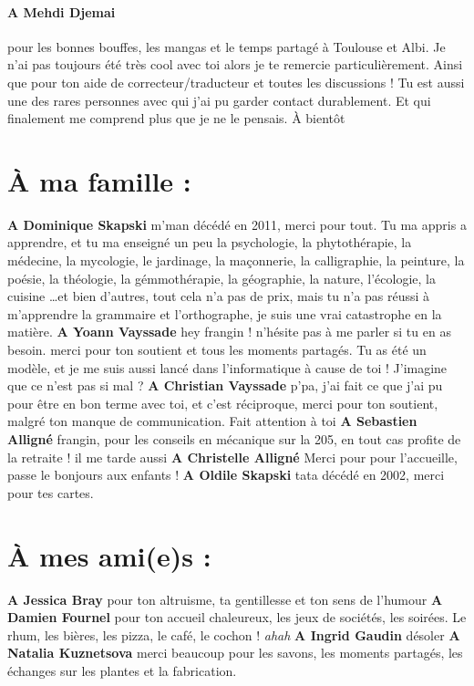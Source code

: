 \documentclass[../thesis.tex]{subfiles}
\begin{document}
\paragraph{A Mehdi Djemai} pour les bonnes bouffes, les mangas et le temps partagé à Toulouse et Albi.
Je n'ai pas toujours été très cool avec toi alors je te remercie particulièrement.
Ainsi que pour ton aide de correcteur/traducteur et toutes les discussions !
Tu est aussi une des rares personnes avec qui j'ai pu garder contact durablement.
Et qui finalement me comprend plus que je ne le pensais. À bientôt 

\section*{À ma famille :}

\textbf{A Dominique Skapski} m'man décédé en 2011, merci pour tout.
Tu ma appris a apprendre, et tu ma enseigné un peu
la psychologie, la phytothérapie, la médecine, la mycologie, le jardinage, la maçonnerie,
la calligraphie, la peinture, la poésie, la théologie, la gémmothérapie, la géographie, la nature, l'écologie, la cuisine
\dots et bien d'autres, tout cela n'a pas de prix, mais tu n'a pas réussi à m'apprendre la grammaire et l'orthographe, je suis une vrai catastrophe en la matière.
\textbf{A Yoann Vayssade} hey frangin ! n'hésite pas à me parler si tu en as besoin.
merci pour ton soutient et tous les moments partagés.
Tu as été un modèle, et je me suis aussi lancé dans l'informatique à cause de toi !
J'imagine que ce n'est pas si mal ?
\textbf{A Christian Vayssade} p'pa, j'ai fait ce que j'ai pu pour être en bon terme avec toi, et c'est réciproque,
merci pour ton soutient, malgré ton manque de communication. Fait attention à toi
\textbf{A Sebastien Alligné} frangin, pour les conseils en mécanique sur la 205, 
en tout cas profite de la retraite ! il me tarde aussi
\textbf{A Christelle Alligné} Merci pour pour l'accueille, passe le bonjours aux enfants !
\textbf{A Oldile Skapski} tata décédé en 2002, merci pour tes cartes.

\newpage
\section*{À mes ami(e)s :}

\textbf{A Jessica Bray} pour ton altruisme, ta gentillesse et ton sens de l'humour
\textbf{A Damien Fournel} pour ton accueil chaleureux, les jeux de sociétés, les soirées.
Le rhum, les bières, les pizza, le café, le cochon ! \textit{ahah}
\textbf{A Ingrid Gaudin} désoler
\textbf{A Natalia Kuznetsova} merci beaucoup pour les savons, les moments partagés, les échanges sur les plantes et la fabrication.
\end{document}
